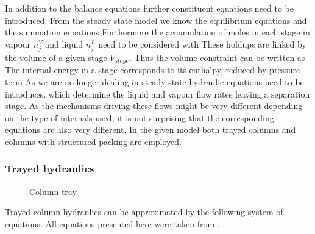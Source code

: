     In addition to the balance equations further constituent equations need to be introduced. From the
    steady state model we know the equilibrium equations
    and the summation equations
    Furthermore the accumulation of moles in each stage in vapour $n_j^V$ and liquid $n_j^L$
    need to be considered with
    These holdups are linked by the volume of a given stage $V_{stage}$. Thus the volume constraint
    can be written as
    The internal energy in a stage corresponds to its enthalpy, reduced by pressure term
    As we are no longer dealing in steady state hydraulic equations need to be introduces,
    which determine the liquid and vapour flow rates leaving a separation stage. As the
    mechanisms driving these flows might be very different depending on the type of internals
    used, it is not surprising that the corresponding equations are also very different. In the
    given model both trayed columns and columns with structured packing are employed.

    \subsubsection{Trayed hydraulics}
    \label{sec:mathpro:dynamic:trayhyd}
        \begin{figure}
            
            \caption{Column tray}
            \label{fig:col_tray}
        \end{figure}

        Trayed column hydraulics can be approximated by the following system of equations.
        All equations presented here were taken from \cite{Lockett.2009}.

